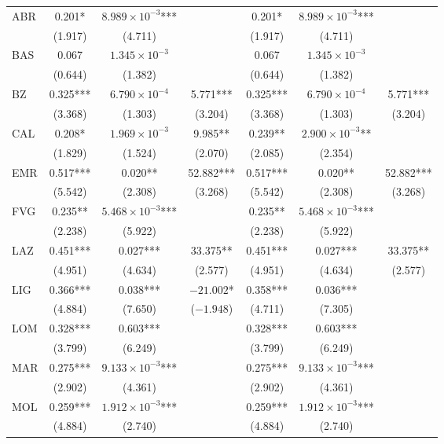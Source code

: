 \documentclass[12pt]{article}
\begin{document}
\begin{appendices}
\begin{longtable}{@{}lcccccc@{}}
            ABR & 0.201* & $8.989 \times 10^{-3}$*** &  & 0.201* & $8.989 \times 10^{-3}$*** &  \\ 
             & (1.917) & (4.711) & & (1.917) & (4.711) &  \\ 
            BAS & 0.067 & $1.345 \times 10^{-3}$ &  & 0.067 & $1.345 \times 10^{-3}$ &  \\ 
             & (0.644) & (1.382) &  & (0.644) & (1.382) &  \\ 
            BZ & 0.325*** & $6.790 \times 10^{-4}$ & 5.771*** & 0.325*** & $6.790 \times 10^{-4}$ & 5.771*** \\ 
             & (3.368) & (1.303) & (3.204) & (3.368) & (1.303) & (3.204) \\ 
            CAL & 0.208* & $1.969 \times 10^{-3}$ & 9.985** & 0.239** & $2.900 \times 10^{-3}$** &  \\ 
             & (1.829) & (1.524) & (2.070) & (2.085) & (2.354) &  \\ 
            EMR & 0.517*** & 0.020** & 52.882*** & 0.517*** & 0.020** & 52.882*** \\ 
             & (5.542) & (2.308) & (3.268) & (5.542) & (2.308) & (3.268) \\ 
            FVG & 0.235** & $5.468 \times 10^{-3}$*** &  & 0.235** & $5.468 \times 10^{-3}$*** &  \\ 
             & (2.238) & (5.922) &  & (2.238) & (5.922) &  \\ 
            LAZ & 0.451*** & 0.027*** & 33.375** & 0.451*** & 0.027*** & 33.375** \\ 
             & (4.951) & (4.634) & (2.577) & (4.951) & (4.634) & (2.577) \\ 
            LIG & 0.366*** & 0.038*** & $-21.002$* & 0.358*** & 0.036*** &  \\ 
             & (4.884) & (7.650) & ($-1.948$) & (4.711) & (7.305) &  \\ 
            LOM & 0.328*** & 0.603*** &  & 0.328*** & 0.603*** &  \\ 
             & (3.799) & (6.249) &  & (3.799) & (6.249) &  \\ 
            MAR & 0.275*** & $9.133 \times 10^{-3}$*** &  & 0.275*** & $9.133 \times 10^{-3}$*** &  \\ 
             & (2.902) & (4.361) &  & (2.902) & (4.361) &  \\ 
            MOL & 0.259*** & $1.912 \times 10^{-3}$*** &  & 0.259*** & $1.912  \times 10^{-3}$*** &  \\ 
             & (4.884) & (2.740) &  & (4.884) & (2.740) &  \\ 

\end{longtable}
\end{appendices}
\end{document}
